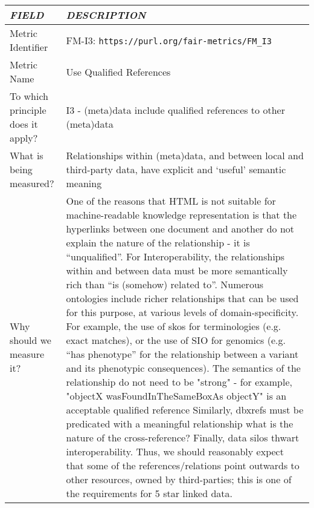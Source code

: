 \documentclass[english]{article}
\begin{document}
\begin{longtable}{|p{5cm}|p{9cm}|}


\hline
\emph{FIELD} & \emph{DESCRIPTION} \\
\hline
Metric Identifier &   FM-I3: \verb"https://purl.org/fair-metrics/FM_I3"
\\


\hline
Metric Name &   



Use Qualified References


 \\



\hline
To which principle does it apply? &   


I3 - (meta)data include qualified references to other (meta)data

\\



\hline
What is being measured? & 


Relationships within (meta)data, and between local and third-party data, have explicit and ‘useful’ semantic meaning


\\



\hline
Why should we measure it? & 


One of the reasons that HTML is not suitable for machine-readable knowledge representation is that the hyperlinks between one document and another do not explain the nature of the relationship - it is “unqualified”.  For Interoperability, the relationships within and between data must be more semantically rich than “is (somehow) related to”.\newline 
\newline 
Numerous ontologies include richer relationships that can be used for this purpose, at various levels of domain-specificity.  For example, the use of skos for terminologies (e.g. exact matches), or the use of SIO for genomics (e.g. “has phenotype” for the relationship between a variant and its phenotypic consequences).  The semantics of the relationship do not need to be "strong" - for example, "objectX  wasFoundInTheSameBoxAs objectY" is an acceptable qualified reference\newline 
\newline 
Similarly, dbxrefs must be predicated with a meaningful relationship  what is the nature of the cross-reference?\newline 
\newline 
Finally, data silos thwart interoperability.  Thus, we should reasonably expect that some of the references/relations point outwards to other resources, owned by third-parties; this is one of the requirements for 5 star linked data. \newline 


\end{longtable}
\end{document}
